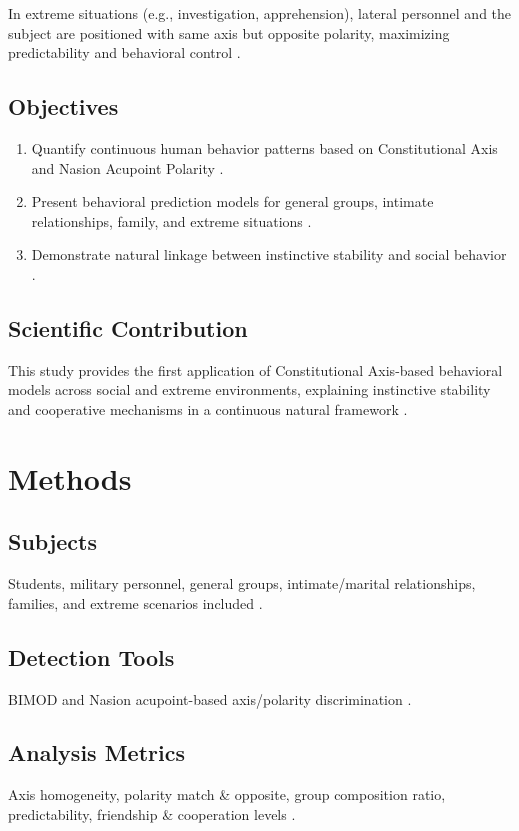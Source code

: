 \documentclass[12pt,a4paper]{article}
\begin{document}
In extreme situations (e.g., investigation, apprehension), lateral personnel and the subject are positioned with same axis but opposite polarity, maximizing predictability and behavioral control \cite{Yoon2026b}.

\subsection{Objectives}
\begin{enumerate}
\item Quantify continuous human behavior patterns based on Constitutional Axis and Nasion Acupoint Polarity \cite{Yoon2026a}.
\item Present behavioral prediction models for general groups, intimate relationships, family, and extreme situations \cite{Yoon2026b}.
\item Demonstrate natural linkage between instinctive stability and social behavior \cite{Yoon2026c}.
\end{enumerate}

\subsection{Scientific Contribution}
This study provides the first application of Constitutional Axis-based behavioral models across social and extreme environments, explaining instinctive stability and cooperative mechanisms in a continuous natural framework \cite{Yoon2026a,Yoon2026b}.

\section{Methods}
\subsection{Subjects}
Students, military personnel, general groups, intimate/marital relationships, families, and extreme scenarios included \cite{Yoon2026c}.

\subsection{Detection Tools}
BIMOD and Nasion acupoint-based axis/polarity discrimination \cite{Yoon2026a}.

\subsection{Analysis Metrics}
Axis homogeneity, polarity match \& opposite, group composition ratio, predictability, friendship \& cooperation levels \cite{Yoon2026b}.
\end{document}
